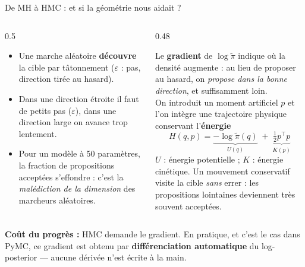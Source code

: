 \begin{frame}{De MH à HMC : et si la géométrie nous aidait ?}
\footnotesize
\begin{columns}[t]
\begin{column}{0.5\textwidth}
\begin{ebox}
\begin{itemize}
  \item Une marche aléatoire \textbf{découvre} la cible par tâtonnement
        ($\varepsilon$ : pas, direction tirée au hasard).
  \item Dans une direction étroite il faut de petits pas
        ($\varepsilon$), dans une direction large on avance trop lentement.
  \item Pour un modèle à 50 paramètres, la fraction de propositions acceptées
        s'effondre : c'est la \emph{malédiction de la dimension} des marcheurs
        aléatoires.
\end{itemize}
\end{ebox}
\end{column}
\begin{column}{0.48\textwidth}
\begin{kbox}
Le \textbf{gradient} de $\log \tilde\pi$ indique où la densité augmente : au lieu
de proposer au hasard, on \emph{propose dans la bonne direction}, et suffisamment
loin.
\\[1mm]
On introduit un moment artificiel $p$ et l'on intègre une trajectoire physique
conservant l'\textbf{énergie}
\[
H(q,p) = \underbrace{-\log \tilde\pi(q)}_{U(q)}
\;+\; \underbrace{\tfrac12 p^{\!\top}p}_{K(p)}
\]
\centering\footnotesize $U$ : énergie potentielle ; $K$ : énergie cinétique.
Un mouvement conservatif visite la cible \emph{sans} errer : les propositions
lointaines deviennent très souvent acceptées.
\end{kbox}
\end{column}
\end{columns}
\vspace{1mm}
\begin{tcolorbox}[colback=byCyan!8,colframe=byCyan,arc=2mm,width=.96\textwidth]
\small\centering
\textbf{Coût du progrès :} HMC demande le gradient. En pratique, et c'est le cas
dans PyMC, ce gradient est obtenu par \textbf{différenciation automatique} du
log-posterior --- aucune dérivée n'est écrite à la main.
\end{tcolorbox}
\end{frame}

